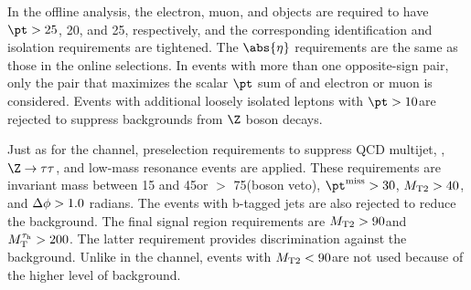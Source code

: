 In the offline analysis, the electron, muon, and \Tau objects are required to have $\pt > 25$, 20, and 25\GeV, respectively,
and the corresponding identification and isolation requirements are tightened. The $\abs{\eta}$ requirements are the same as those in the online selections.
In events with more than one opposite-sign \leptonTau pair, only
 the pair that maximizes the scalar $\pt$ sum of \Tau and electron or muon is considered.  Events with additional loosely isolated leptons
with $\pt > 10$\GeV are rejected to suppress backgrounds from $\Z$ boson
decays.

Just as for the \tauTau channel, preselection requirements to suppress
QCD multijet, \ttbar, $\Z \to \tau \tau$, and low-mass resonance events are applied.
 These requirements are \leptonTau 
invariant mass between 15 and 45\GeV or $>$ 75\GeV (\Z boson veto), $\MPT > 30$\GeV, ${M_\mathrm{ T2}} > 40$\GeV, 
and $\Delta\phi > 1.0$ radians. 
The events with b-tagged jets are also rejected to reduce the \ttbar background.
  The final signal region requirements are ${M_\mathrm{ T2}} > 90$\GeV and $M_\mathrm{T}^{\tau_\mathrm{h}} > 200$\GeV.
The latter requirement provides discrimination against the \wjets background.  Unlike in the \tauTau channel,
events with ${M_\mathrm{ T2}} < 90$\GeV are not used because of the higher
level of background.

